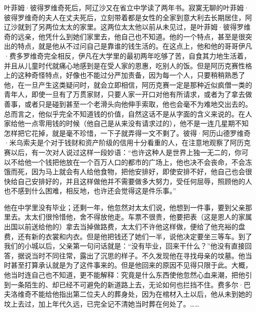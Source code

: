 \par 叶菲姆·彼得罗维奇死后，阿辽沙又在省立中学读了两年书。寂寞无聊的叶菲姆·彼得罗维奇的夫人在丈夫死后，立刻带着都是女性的全家到意大利去长期居住，阿辽沙就到了另两位太太的家里。这两位太太他以前从未见过，是叶菲姆·彼得罗维奇的远亲，他凭什么到她们家里去，他自己也不知道。他的一个特点，甚至是很突出的特点，就是他从不过问自己是靠谁的钱生活的。在这点上，他和他的哥哥伊凡·费多罗维奇完全相反，伊凡在大学里的最初两年吃够了苦，自食其力地生活着，并且从儿童时代就痛心地感到是在受人家的恩惠，吃别人的饭。但是阿历克赛性格上的这种奇怪特点，好像也不能过分严加责备，因为每一个人，只要稍稍熟悉了他，在一旦产生这类疑问时，就会立即相信，阿历克赛一定是那种近似疯僧一类的青年人，即使一旦有了万贯家财，只要人家一开口对他有所请求，或者为了拿去做善事，或者只是碰到甚至一个老滑头向他伸手索取，他也会毫不为难地交出去的。总而言之，他似乎完全不知道钱的价值，自然这话不是从字面的含义来说的。在人家给他一点零用钱的时候（他自己是从来没有请求过的），他不是一连几星期不知怎样把它花掉，就是毫不珍惜，一下子就弄得一文不剩了。彼得·阿历山德罗维奇·米乌索夫是个对于钱财和资产阶级的信用十分看重的人，在注意地观察了阿历克赛以后，有一次对人说过这样一段妙语：“也许这种人是世界上独一无二的，你可以不给他一个钱把他放在一个百万人口的都市的广场上，他也决不会丧命，不会冻饿而死，因为马上就会有人给他食物，把他安排好，即使安排不好，他自己也会很快给自己安排好的，并且这样做他并不需要做多大努力，受任何屈辱，照顾他的人也不感到什么困难，相反地，也许还会觉得这是件乐事。”
\par 他在中学里没有毕业；还剩一年，他忽然对太太们说，他想到一件事，要到父亲那里去。太太们很怜惜他，舍不得放他走。车票不很贵，他要把表（这是恩人的家属出国以前送给他的）拿去当掉做路费，太太们不许他这样做，便给了他充裕的盘费，还有新的衣裳和内衣。但是他把钱还了她们一半，说他决定要坐三等车。到了我们的小城以后，父亲第一句问话就是：“没有毕业，回来干什么？”他没有直接回答，据说当时不同往常，露出了沉思的样子。不久发现他在寻找母亲的坟墓。他当时甚至打算承认就是为了这件事来的。但是他回来的原因不见得只限于此。大概，他当时连自己也不知道，更不能解释：究竟是什么东西使他忽然心血来潮，把他引到一条陌生的、却已经不可避免的新道路上去，无论如何也拦挡不住。费多尔·巴夫洛维奇不能给他指出第二位夫人的葬身处，因为在棺材入土以后，他从未到她的坟上去过，加上年代久远，已完全记不清她当时葬在何处了。……

